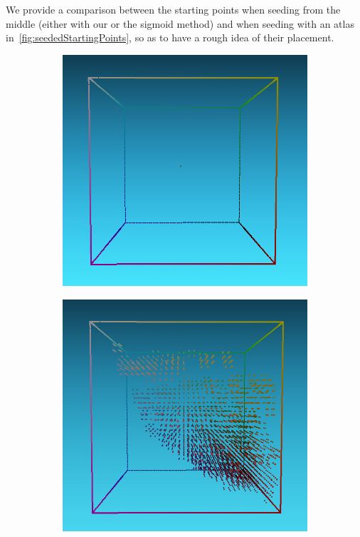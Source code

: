 We provide a comparison between the starting points when seeding from the middle (either with our or the sigmoid method) and when seeding with an atlas in~\cref{fig:seededStartingPoints}, so as to have a rough idea of their placement.

\begin{figure}[t]
	\centering
	\captionsetup[subfigure]{font=footnotesize,labelfont=footnotesize}
	\captionsetup[subfigure]{justification=centering}
	\begin{subfigure}[t]{0.45\textwidth}
		\includegraphics[width=\linewidth]{img/seededStarting_sigmoid.png}
		\label{fig:seededStarting_sigmoid}
	\end{subfigure} \hspace{0.2em}
	\begin{subfigure}[t]{0.45\textwidth}
		\includegraphics[width=\linewidth]{img/seededStarting_mcb.png}

\end{subfigure}
\end{figure}
